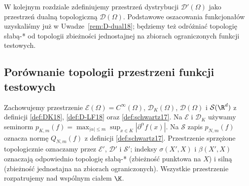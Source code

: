 \begin{uwaga}
\label{rem:D-distributions-next18}
W kolejnym rozdziale zdefiniujemy przestrzeń dystrybucji
$\mathcal D'(\Omega)$ jako przestrzeń dualną topologiczną
$\mathcal D(\Omega)$. Podstawowe oszacowania funkcjonałów
uzyskaliśmy już w Uwadze~\ref{rem:D-dual18}; będziemy też
odróżniać topologię słabą-* od topologii zbieżności
jednostajnej na zbiorach ograniczonych funkcji testowych.
\end{uwaga}

\subsection{Porównanie topologii przestrzeni funkcji testowych}
\label{sec:synteza25}

\begin{definicja}
\label{def:trzy-przestrzenie25}
Zachowujemy przestrzenie $\mathcal E(\Omega)=C^\infty(\Omega)$,
$\mathcal D_K(\Omega)$, $\mathcal D(\Omega)$ i $\mathcal S(\R^d)$
z definicji \ref{def:DK18}, \ref{def:D-LF18}
oraz \ref{def:schwartz17}. Na $\mathcal E$ i $\mathcal D_K$
używamy seminorm
$p_{K,m}(f)=\max_{|\alpha|\le m}\sup_{x\in K}|\partial^\alpha f(x)|$.
Na $\mathcal S$ zapis $p_{N,m}(f)$ oznacza normę
$Q_{N,m}(f)$ z definicji \ref{def:schwartz17}.
Przestrzenie sprzężone topologicznie oznaczamy przez
$\mathcal E'$, $\mathcal D'$ i $\mathcal S'$; indeksy
$\sigma(X',X)$ i $\beta(X',X)$ oznaczają odpowiednio
topologię słabą-* (zbieżność punktowa na $X$)
i silną (zbieżność jednostajna na zbiorach ograniczonych).
Wszystkie przestrzenie rozpatrujemy nad wspólnym ciałem $\K$.
\end{definicja}

